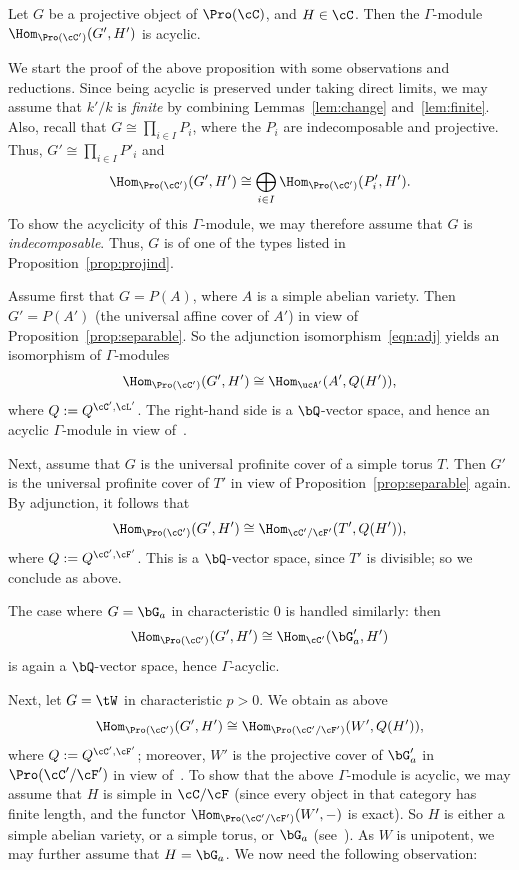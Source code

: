 \begin{prop}\label{prop:acyclic}
Let $G$ be a projective object of $\Pro(\cC)$, and $H \in \cC$. Then the $\Gamma$-module $\Hom_{\Pro(\cC')}(G',H')$ is acyclic.
\end{prop}


We start the proof of the above proposition with some observations and reductions. Since being acyclic is preserved under taking direct limits, we may assume that $k'/k$ is \emph{finite} by combining Lemmas~\ref{lem:change} and~\ref{lem:finite}. Also, recall that $G \cong \prod_{i \in I} P_i$, where the $P_i$ are indecomposable and projective. Thus, $G' \cong \prod_{i \in I} P'_i$ and
\[
\Hom_{\Pro(\cC')}(G', H')
\cong \bigoplus_{i \in I}
\Hom_{\Pro(\cC')}(P'_i, H').
\]
To show the acyclicity of this $\Gamma$-module, we may therefore assume that $G$ is \emph{indecomposable}. Thus, $G$ is of one of the types listed in Proposition~\ref{prop:projind}.

Assume first that $G = P(A)$, where $A$ is a simple abelian variety. Then $G' = P(A')$ (the universal affine cover of $A'$) in view of Proposition~\ref{prop:separable}. So the adjunction isomorphism~\eqref{eqn:adj} yields an isomorphism of $\Gamma$-modules
\[
\Hom_{\Pro(\cC')}(G',H') \cong \Hom_{\ucA'}(A', Q(H')),
\]
where $Q := Q^{\cC', \cL'}$. The right-hand side is a $\bQ$-vector space, and hence an acyclic $\Gamma$-module in view of~\cite[V.3.5.1]{DG}.

Next, assume that $G$ is the universal profinite cover of a simple torus $T$. Then $G'$ is the universal profinite cover of $T'$ in view of Proposition~\ref{prop:separable} again. By adjunction, it follows that
\[
\Hom_{\Pro(\cC')}(G',H') \cong
\Hom_{\cC'/\cF'}(T', Q(H')),
\]
where $Q := Q^{\cC', \cF'}$. This is a $\bQ$-vector space, since $T'$ is divisible; so we conclude as above.

The case where $G = \bG_a$ in characteristic $0$ is handled similarly: then
\[
\Hom_{\Pro(\cC')}(G',H') \cong
\Hom_{\cC'}(\bG'_a,H')
\]
is again a $\bQ$-vector space, hence $\Gamma$-acyclic.

Next, let $G = \tW$ in characteristic $p > 0$. We obtain as above
\[
\Hom_{\Pro(\cC')}(G',H') \cong
\Hom_{\Pro(\cC'/\cF')}(W',Q (H')),
\]
where $Q := Q^{\cC',\cF'}$; moreover, $W'$ is the projective cover of $\bG'_a$ in $\Pro(\cC'/\cF')$ in view of~\cite[V.3.7.5]{DG}. To show that the above $\Gamma$-module is acyclic, we may assume that $H$ is simple in $\cC/\cF$ (since every object in that category has finite length, and the functor $\Hom_{\Pro(\cC'/\cF')}(W', -)$ is exact). So $H$ is either a simple abelian variety, or a simple torus, or $\bG_a$ (see~\cite[Prop.~3.2]{Br17a}). As $W$ is unipotent, we may further assume that $H = \bG_a$. We now need the following observation:

